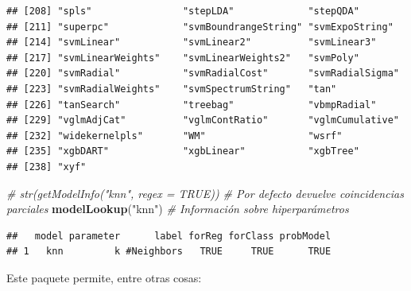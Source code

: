 \documentclass[]{book}
\newenvironment{Shaded}{\begin{snugshade}}{\end{snugshade}}
\newcommand{\KeywordTok}[1]{\textcolor[rgb]{0.13,0.29,0.53}{\textbf{#1}}}
\newcommand{\StringTok}[1]{\textcolor[rgb]{0.31,0.60,0.02}{#1}}
\newcommand{\CommentTok}[1]{\textcolor[rgb]{0.56,0.35,0.01}{\textit{#1}}}
\newcommand{\NormalTok}[1]{#1}
\theoremstyle{break}
\theoremstyle{definition}
\theoremstyle{definition}
\theoremstyle{definition}
\theoremstyle{remark}
\begin{document}
\begin{verbatim}
## [208] "spls"                "stepLDA"             "stepQDA"            
## [211] "superpc"             "svmBoundrangeString" "svmExpoString"      
## [214] "svmLinear"           "svmLinear2"          "svmLinear3"         
## [217] "svmLinearWeights"    "svmLinearWeights2"   "svmPoly"            
## [220] "svmRadial"           "svmRadialCost"       "svmRadialSigma"     
## [223] "svmRadialWeights"    "svmSpectrumString"   "tan"                
## [226] "tanSearch"           "treebag"             "vbmpRadial"         
## [229] "vglmAdjCat"          "vglmContRatio"       "vglmCumulative"     
## [232] "widekernelpls"       "WM"                  "wsrf"               
## [235] "xgbDART"             "xgbLinear"           "xgbTree"            
## [238] "xyf"
\end{verbatim}

\begin{Shaded}
\begin{Highlighting}[]
\CommentTok{# str(getModelInfo("knn", regex = TRUE)) # Por defecto devuelve coincidencias parciales}
\KeywordTok{modelLookup}\NormalTok{(}\StringTok{"knn"}\NormalTok{)  }\CommentTok{# Información sobre hiperparámetros}
\end{Highlighting}
\end{Shaded}

\begin{verbatim}
##   model parameter      label forReg forClass probModel
## 1   knn         k #Neighbors   TRUE     TRUE      TRUE
\end{verbatim}

Este paquete permite, entre otras cosas:
\end{document}

